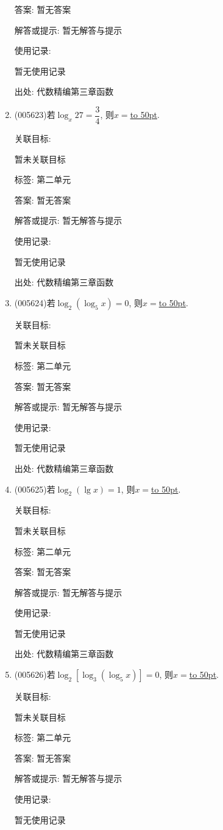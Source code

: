 \documentclass[10pt,a4paper]{article}
\newcommand{\blank}[1]{\underline{\hbox to #1pt{}}}
\begin{document}
\begin{enumerate}[1.]
答案: 暂无答案

解答或提示: 暂无解答与提示

使用记录:

暂无使用记录


出处: 代数精编第三章函数
\item { (005623)}若$\log_x27=\dfrac 34$, 则$x=$\blank{50}.


关联目标:

暂未关联目标



标签: 第二单元

答案: 暂无答案

解答或提示: 暂无解答与提示

使用记录:

暂无使用记录


出处: 代数精编第三章函数
\item { (005624)}若$\log_2(\log_5x)=0$, 则$x=$\blank{50}.


关联目标:

暂未关联目标



标签: 第二单元

答案: 暂无答案

解答或提示: 暂无解答与提示

使用记录:

暂无使用记录


出处: 代数精编第三章函数
\item { (005625)}若$\log_2(\lg x)=1$, 则$x=$\blank{50}.


关联目标:

暂未关联目标



标签: 第二单元

答案: 暂无答案

解答或提示: 暂无解答与提示

使用记录:

暂无使用记录


出处: 代数精编第三章函数
\item { (005626)}若$\log_2[\log_3(\log_5x)]=0$, 则$x=$\blank{50}.


关联目标:

暂未关联目标



标签: 第二单元

答案: 暂无答案

解答或提示: 暂无解答与提示

使用记录:

暂无使用记录



\end{enumerate}
\end{document}
